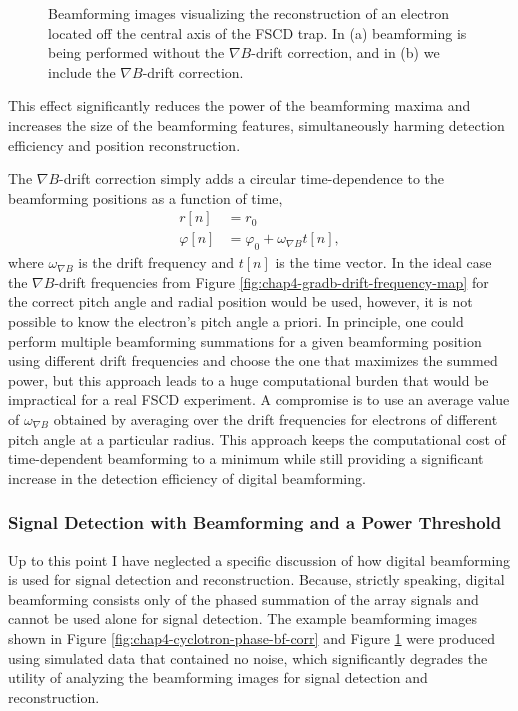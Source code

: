 \begin{figure}[htbp]
\begin{subfigure}{0.45\textwidth}
        \caption{}
    \end{subfigure}
    \caption{Beamforming images visualizing the reconstruction of an electron located off the central axis of the FSCD trap. In (a) beamforming is being performed without the $\nabla B$-drift correction, and in (b) we include the $\nabla B$-drift correction.}
    \label{fig:chap4-gradb-bf-drift-corr}
\end{figure}
This effect significantly reduces the power of the beamforming maxima and increases the size of the beamforming features, simultaneously harming detection efficiency and position reconstruction. 

The $\nabla B$-drift correction simply adds a circular time-dependence to the beamforming positions as a function of time,
\begin{align}
    r[n]&=r_0\\
    \varphi[n]&=\varphi_0 + \omega_{\nabla B}t[n], 
\end{align}
where $\omega_{\nabla B}$ is the drift frequency and $t[n]$ is the time vector. In the ideal case the $\nabla B$-drift frequencies from Figure \ref{fig:chap4-gradb-drift-frequency-map} for the correct pitch angle and radial position would be used, however, it is not possible to know the electron's pitch angle a priori. In principle, one could perform multiple beamforming summations for a given beamforming position using different drift frequencies and choose the one that maximizes the summed power, but this approach leads to a huge computational burden that would be impractical for a real FSCD experiment. A compromise is to use an average value of $\omega_{\nabla B}$ obtained by averaging over the drift frequencies for electrons of different pitch angle at a particular radius. This approach keeps the computational cost of time-dependent beamforming to a minimum while still providing a significant increase in the detection efficiency of digital beamforming.

\subsubsection*{Signal Detection with Beamforming and a Power Threshold}

Up to this point I have neglected a specific discussion of how digital beamforming is used for signal detection and reconstruction. Because, strictly speaking, digital beamforming consists only of the phased summation of the array signals and cannot be used alone for signal detection. The example beamforming images shown in Figure \ref{fig:chap4-cyclotron-phase-bf-corr} and Figure \ref{fig:chap4-gradb-bf-drift-corr} were produced using simulated data that contained no noise, which significantly degrades the utility of analyzing the beamforming images for signal detection and reconstruction. 

